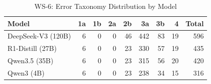 \begin{table}[htbp]
\centering
\caption{WS-6: Error Taxonomy Distribution by Model}
\label{tab:ws6-error-taxonomy}
\begin{tabular}{lrrrrrrrr}
\toprule
Model & 1a & 1b & 2a & 2b & 3a & 3b & 4 & Total \\
\midrule
DeepSeek-V3 (120B) & 6 & 0 & 0 & 46 & 442 & 83 & 19 & 596 \\
R1-Distill (27B) & 6 & 0 & 0 & 23 & 330 & 57 & 19 & 435 \\
Qwen3.5 (35B) & 6 & 0 & 0 & 23 & 315 & 56 & 20 & 420 \\
Qwen3 (4B) & 6 & 0 & 0 & 23 & 238 & 34 & 15 & 316 \\
\bottomrule
\end{tabular}
\end{table}
